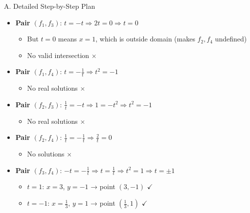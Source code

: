 \documentclass[12pt]{article}
\begin{document}
\begin{roadmapbox}{A. Detailed Step-by-Step Plan}
\begin{enumerate}[leftmargin=*]
\begin{itemize}
        \item \textbf{Pair $(f_1, f_3)$}: $t = -t \Rightarrow 2t = 0 \Rightarrow t = 0$
        \begin{itemize}
            \item But $t = 0$ means $x = 1$, which is outside domain (makes $f_2, f_4$ undefined)
            \item No valid intersection $\times$
        \end{itemize}
        
        \item \textbf{Pair $(f_1, f_4)$}: $t = -\frac{1}{t} \Rightarrow t^2 = -1$
        \begin{itemize}
            \item No real solutions $\times$
        \end{itemize}
        
        \item \textbf{Pair $(f_2, f_3)$}: $\frac{1}{t} = -t \Rightarrow 1 = -t^2 \Rightarrow t^2 = -1$
        \begin{itemize}
            \item No real solutions $\times$
        \end{itemize}
        
        \item \textbf{Pair $(f_2, f_4)$}: $\frac{1}{t} = -\frac{1}{t} \Rightarrow \frac{2}{t} = 0$
        \begin{itemize}
            \item No solutions $\times$
        \end{itemize}
        
        \item \textbf{Pair $(f_3, f_4)$}: $-t = -\frac{1}{t} \Rightarrow t = \frac{1}{t} \Rightarrow t^2 = 1 \Rightarrow t = \pm 1$
        \begin{itemize}
            \item $t = 1$: $x = 3$, $y = -1$ → point $(3, -1)$ $\checkmark$
            \item $t = -1$: $x = \frac{1}{3}$, $y = 1$ → point $(\frac{1}{3}, 1)$ $\checkmark$
        \end{itemize}
    \end{itemize}
    

\end{enumerate}
\end{roadmapbox}
\end{document}
